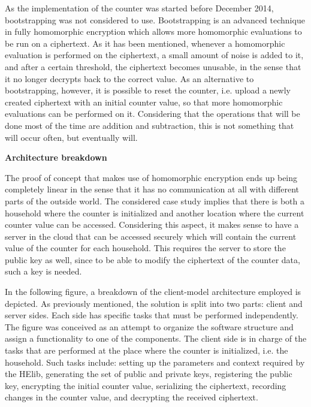 As the implementation of the counter was started before December 2014, bootstrapping was not considered to use. Bootstrapping is an advanced technique in fully homomorphic encryption which allows more homomorphic evaluations to be run on a ciphertext. As it has been mentioned, whenever a homomorphic evaluation is performed on the ciphertext, a small amount of noise is added to it, and after a certain threshold, the ciphertext becomes unusable, in the sense that it no longer decrypts back to the correct value. As an alternative to bootstrapping, however, it is possible to reset the counter, i.e. upload a newly created ciphertext with an initial counter value, so that more homomorphic evaluations can be performed on it. Considering that the operations that will be done most of the time are addition and subtraction, this is not something that will occur often, but eventually will. 

\textbf{Architecture breakdown}

The proof of concept that makes use of homomorphic encryption ends up being completely linear in the sense that it has no communication at all with different parts of the outside world. The considered case study implies that there is both a household where the counter is initialized and another location where the current counter value can be accessed. Considering this aspect, it makes sense to have a server in the cloud that can be accessed securely which will contain the current value of the counter for each household. This requires the server to store the public key as well, since to be able to modify the ciphertext of the counter data, such a key is needed. 

In the following figure, a breakdown of the client-model architecture employed is depicted. As previously mentioned, the solution is split into two parts: client and server sides. Each side has specific tasks that must be performed independently. The figure was conceived as an attempt to organize the software structure and assign a functionality to one of the components. The client side is in charge of the tasks that are performed at the place where the counter is initialized, i.e. the household. Such tasks include: setting up the parameters and context required by the HElib, generating the set of public and private keys, registering the public key, encrypting the initial counter value, serializing the ciphertext, recording changes in the counter value, and decrypting the received ciphertext. 

